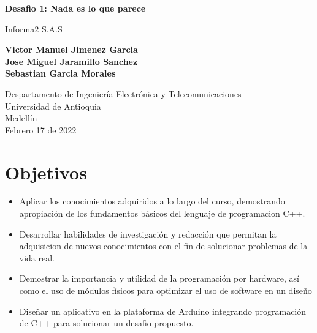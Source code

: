 \documentclass{article}
\begin{document}
\begin{titlepage}
    \begin{center}
        \vspace*{1cm}
            
        \Huge
        \textbf{Desafio 1: Nada es lo que parece}
            
        \vspace{0.5cm}
        \LARGE
        Informa2 S.A.S
            
        \vspace{1.5cm}
            
        \textbf{Victor Manuel Jimenez Garcia\\
                Jose Miguel Jaramillo Sanchez\\
                Sebastian Garcia Morales}

        \vfill
            
        \vspace{0.8cm}
            
        \Large
        Despartamento de Ingeniería Electrónica y Telecomunicaciones\\
        Universidad de Antioquia\\
        Medellín\\
        Febrero 17 de 2022
            
    \end{center}
\end{titlepage}

\tableofcontents

\newpage
\section{Objetivos}\label{objetivos}
\begin{itemize}
    \item Aplicar los conocimientos adquiridos a lo largo del curso, demostrando apropiación de los fundamentos básicos del lenguaje de programacion C++.
    \item Desarrollar habilidades de investigación y redacción que permitan la adquisicion de nuevos conocimientos con el fin de solucionar problemas de la vida real.
    \item Demostrar la importancia y utilidad de la programación por hardware, así como el uso de módulos físicos para optimizar el uso de software en un diseño
    \item Diseñar un aplicativo en la plataforma de Arduino integrando programación de C++ para solucionar un desafio  propuesto.
\end{itemize}
\end{document}
